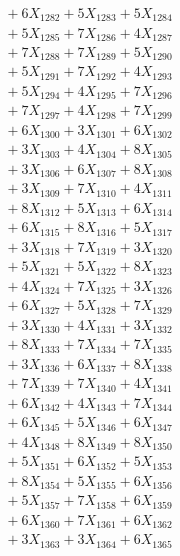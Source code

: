 \documentclass[a4paper,10pt]{article}
\begin{document}
{\begin{align}
&\;  + 6 X_{1282} + 5 X_{1283} + 5 X_{1284} \\[0.3ex]
&\;  + 5 X_{1285} + 7 X_{1286} + 4 X_{1287} \\[0.3ex]
&\;  + 7 X_{1288} + 7 X_{1289} + 5 X_{1290} \\[0.3ex]
&\;  + 5 X_{1291} + 7 X_{1292} + 4 X_{1293} \\[0.3ex]
&\;  + 5 X_{1294} + 4 X_{1295} + 7 X_{1296} \\[0.3ex]
&\;  + 7 X_{1297} + 4 X_{1298} + 7 X_{1299} \\[0.5ex]\allowbreak
&\;  + 6 X_{1300} + 3 X_{1301} + 6 X_{1302} \\[0.3ex]
&\;  + 3 X_{1303} + 4 X_{1304} + 8 X_{1305} \\[0.3ex]
&\;  + 3 X_{1306} + 6 X_{1307} + 8 X_{1308} \\[0.3ex]
&\;  + 3 X_{1309} + 7 X_{1310} + 4 X_{1311} \\[0.3ex]
&\;  + 8 X_{1312} + 5 X_{1313} + 6 X_{1314} \\[0.3ex]
&\;  + 6 X_{1315} + 8 X_{1316} + 5 X_{1317} \\[0.3ex]
&\;  + 3 X_{1318} + 7 X_{1319} + 3 X_{1320} \\[0.3ex]
&\;  + 5 X_{1321} + 5 X_{1322} + 8 X_{1323} \\[0.3ex]
&\;  + 4 X_{1324} + 7 X_{1325} + 3 X_{1326} \\[0.3ex]
&\;  + 6 X_{1327} + 5 X_{1328} + 7 X_{1329} \\[0.5ex]\allowbreak
&\;  + 3 X_{1330} + 4 X_{1331} + 3 X_{1332} \\[0.3ex]
&\;  + 8 X_{1333} + 7 X_{1334} + 7 X_{1335} \\[0.3ex]
&\;  + 3 X_{1336} + 6 X_{1337} + 8 X_{1338} \\[0.3ex]
&\;  + 7 X_{1339} + 7 X_{1340} + 4 X_{1341} \\[0.3ex]
&\;  + 6 X_{1342} + 4 X_{1343} + 7 X_{1344} \\[0.3ex]
&\;  + 6 X_{1345} + 5 X_{1346} + 6 X_{1347} \\[0.3ex]
&\;  + 4 X_{1348} + 8 X_{1349} + 8 X_{1350} \\[0.3ex]
&\;  + 5 X_{1351} + 6 X_{1352} + 5 X_{1353} \\[0.3ex]
&\;  + 8 X_{1354} + 5 X_{1355} + 6 X_{1356} \\[0.3ex]
&\;  + 5 X_{1357} + 7 X_{1358} + 6 X_{1359} \\[0.5ex]\allowbreak
&\;  + 6 X_{1360} + 7 X_{1361} + 6 X_{1362} \\[0.3ex]
&\;  + 3 X_{1363} + 3 X_{1364} + 6 X_{1365} \\[0.3ex]

\end{align}}
\end{document}

